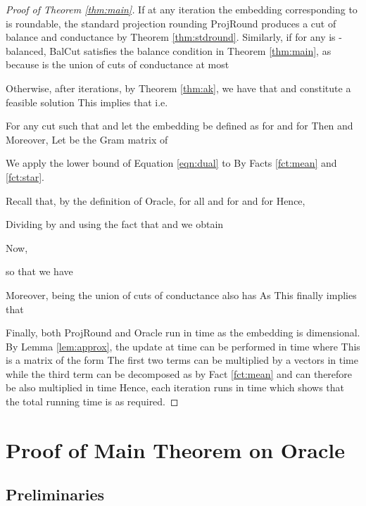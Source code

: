 \documentclass[twoside,leqno,twocolumn]{article}
\numberwithin{equation}{section}
\newcommand{\alg}{{\sc BalCut}\xspace}
\begin{document}
\begin{proof}[Proof of Theorem \ref{thm:main}]
If at any iteration  the embedding  corresponding to   is roundable, the standard projection rounding {\sc ProjRound}\xspace produces a cut of balance  and conductance  by Theorem \ref{thm:stdround}. Similarly, if for any   is -balanced, \alg satisfies the balance condition  in Theorem \ref{thm:main}, as  because  is the union of cuts of conductance at most 


Otherwise, after  iterations, by Theorem \ref{thm:ak}, we have that   and  constitute a feasible solution   This implies that
 i.e.


For any cut  such that  and  let the embedding  be defined as  for  and  for 
Then  and  Moreover,   
Let  be the Gram matrix of  

We apply the lower bound of Equation \ref{eqn:dual} to  By Facts \ref{fct:mean} and \ref{fct:star}.


Recall that, by the definition of {\sc Oracle}, for all   and  for  and  for  Hence,


Dividing by  and using the fact that  and  we obtain

Now,

so that we have

Moreover, being the union of cuts of conductance   also has 
As   This finally implies that

Finally,  both {\sc ProjRound} and {\sc Oracle} run in time  as the embedding is  dimensional. By Lemma \ref{lem:approx}, the update at time  can be performed in time  where  This is a matrix of the form  The first two terms can be multiplied by a  vectors in time  while the third term can be decomposed as  by Fact \ref{fct:mean} and can therefore be also multiplied in time 
Hence, each iteration runs in time  which shows that the total running time is  as required.







\end{proof}



\section{Proof of Main Theorem on {\sc Oracle}} \label{sec:mp}


\subsection{Preliminaries}
\end{document}
